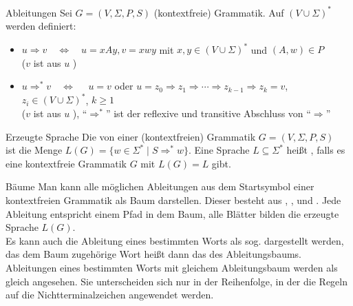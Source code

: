 \begin{Def}{Ableitungen}
    Sei $G = (V, \Sigma, P, S)$ (kontextfreie) Grammatik. Auf
    $(V \cup \Sigma)^\ast$ werden definiert:
    \begin{itemize}
        \item $u \Rightarrow v \quad\Leftrightarrow\quad u = xAy, v = xwy$ mit
        $x, y \in (V \cup \Sigma)^\ast$ und $(A, w) \in P$ \\
        ($v$ ist aus $u$ )
        
        \item $u \Rightarrow^\ast v \quad\Leftrightarrow\quad$
        $u = v$ oder
        $u = z_0 \Rightarrow z_1 \Rightarrow \cdots \Rightarrow z_{k-1}
        \Rightarrow z_k = v$, $z_i \in (V \cup \Sigma)^\ast$, $k \ge 1$ \\
        ($v$ ist aus $u$ ),
        "`$\Rightarrow^\ast$"' ist der reflexive und transitive Abschluss
        von "`$\Rightarrow$"'
    \end{itemize}
\end{Def}

\begin{Def}{Erzeugte Sprache}
    Die von einer (kontextfreien) Grammatik $G = (V, \Sigma, P, S)$ \\
     ist die Menge
    $L(G) = \{w \in \Sigma^\ast \;|\; S \Rightarrow^\ast w\}$.
    Eine Sprache $L \subseteq \Sigma^\ast$ heißt
    , falls es eine kontextfreie Grammatik $G$
    mit $L(G) = L$ gibt.
\end{Def}

\begin{Def}{Bäume}
    Man kann alle möglichen Ableitungen aus dem Startsymbol einer kontextfreien
    Grammatik als Baum darstellen.
    Dieser besteht aus , , 
    und .
    Jede Ableitung entspricht einem Pfad in dem Baum, alle Blätter bilden
    die erzeugte Sprache $L(G)$. \\
    Es kann auch die Ableitung eines bestimmten Worts als sog.
     dargestellt werden, das dem Baum zugehörige Wort
    heißt dann das  des Ableitungsbaums. \\
    Ableitungen eines bestimmten Worts mit gleichem Ableitungsbaum werden als
    gleich angesehen.
    Sie unterscheiden sich nur in der Reihenfolge, in der die Regeln auf die
    Nichtterminalzeichen angewendet werden.
\end{Def}

